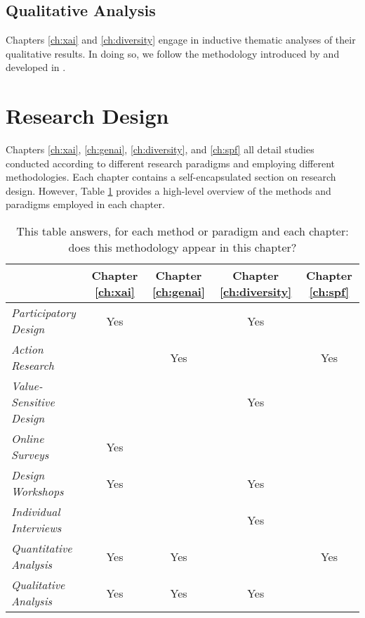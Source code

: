 \subsection{Qualitative Analysis}
Chapters \ref{ch:xai} and \ref{ch:diversity} engage in inductive thematic analyses of their qualitative results. In doing so, we follow the methodology introduced by \textcite{braun_using_2006} and developed in \textcite{braun_conceptual_2022,braun_toward_2023,noauthor_thematic_nodate}.

\section{Research Design}
Chapters \ref{ch:xai}, \ref{ch:genai}, \ref{ch:diversity}, and \ref{ch:spf} all detail studies conducted according to different research paradigms and employing different methodologies. Each chapter contains a self-encapsulated section on research design. However, Table \ref{tab:method_subsections} provides a high-level overview of the methods and paradigms employed in each chapter.

\begin{table}[htbp]
    \centering
    \begin{tabular}{|l|c|c|c|c|}
    \hline
    & \textbf{Chapter \ref{ch:xai}} & \textbf{Chapter \ref{ch:genai}} & \textbf{Chapter \ref{ch:diversity}} & \textbf{Chapter \ref{ch:spf}} \\
    \hline
    \textit{Participatory Design} & Yes & & Yes & \\ 
    \textit{Action Research} & & Yes & & Yes \\ 
    \textit{Value-Sensitive Design} & & & Yes & \\ 
    \hline
    \textit{Online Surveys} & Yes & & & \\ 
    \textit{Design Workshops} & Yes & & Yes & \\ 
    \textit{Individual Interviews} & & & Yes & \\ 
    \textit{Quantitative Analysis} & Yes & Yes & & Yes \\ 
    \textit{Qualitative Analysis} & Yes & Yes & Yes & \\
    \hline
    \end{tabular}
    \caption{This table answers, for each method or paradigm and each chapter: does this methodology appear in this chapter?}
    \label{tab:method_subsections}
\end{table}
